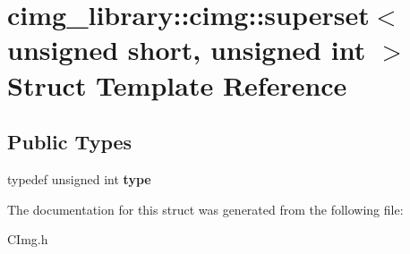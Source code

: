 \hypertarget{structcimg__library_1_1cimg_1_1superset_3_01unsigned_01short_00_01unsigned_01int_01_4}{\section{cimg\-\_\-library\-:\-:cimg\-:\-:superset$<$ unsigned short, unsigned int $>$ Struct Template Reference}
\label{structcimg__library_1_1cimg_1_1superset_3_01unsigned_01short_00_01unsigned_01int_01_4}
}
\subsection*{Public Types}
\begin{DoxyCompactItemize}
\item 
\hypertarget{structcimg__library_1_1cimg_1_1superset_3_01unsigned_01short_00_01unsigned_01int_01_4_a29a4e04176c97360821e141614ef46ee}{typedef unsigned int {\bfseries type}}\label{structcimg__library_1_1cimg_1_1superset_3_01unsigned_01short_00_01unsigned_01int_01_4_a29a4e04176c97360821e141614ef46ee}

\end{DoxyCompactItemize}


The documentation for this struct was generated from the following file\-:\begin{DoxyCompactItemize}
\item 
C\-Img.\-h\end{DoxyCompactItemize}
